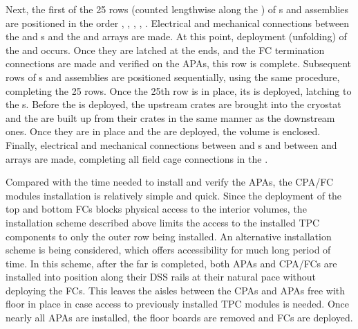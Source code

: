 Next, the first of the 25 rows (counted lengthwise along the ) of s and  assemblies are positioned in the order , , , , .  Electrical and mechanical connections between the  and s and the  and  arrays are made.  At this point, deployment (unfolding) of the  and  %
occurs.  Once they %
are latched at the  ends, and the FC termination connections are made and verified on the APAs, this  row is complete.  Subsequent rows of s and  assemblies are positioned sequentially, using the same procedure, completing the 25 rows. %
Once the 25th row is in place, its  %
is deployed, latching to the s.  Before the  is deployed, the upstream  crates are brought into the cryostat 
and the  are built up from their crates in the same manner as the downstream ones. %
Once they %
are in place and the  are deployed, the  volume is enclosed. %
Finally, electrical and mechanical connections between  and s and between  and  arrays are made, completing all field cage connections in the .

Compared with the time needed to install and verify the APAs, the CPA/FC modules installation is relatively simple and quick.  Since the deployment of the top and bottom FCs blocks physical access to the interior volumes, the installation scheme described above limits the access to the installed TPC components to only the outer row being installed.  An alternative installation scheme is being considered, which offers accessibility for much long period of time.  In this scheme, after the far  is completed, both APAs and CPA/FCs are installed into position along their DSS rails at their natural pace without deploying the FCs. This leaves the aisles between the CPAs and APAs free with floor in place in case access to previously installed TPC modules is needed.  Once nearly all APAs are installed, the floor boards are removed and FCs are deployed.   





